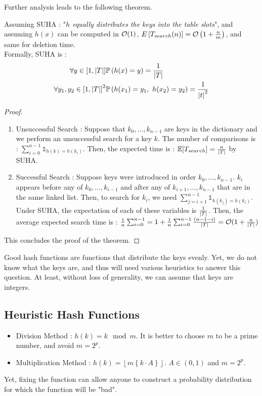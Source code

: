 \documentclass{cours}
\begin{document}
Further analysis leads to the following theorem. 
\begin{theorem}
    Assuming SUHA : "\textit{$h$ equally distributes the keys into the table slots}", and assuming $h(x)$ can be computed in $\mathcal{O}(1)$, $E\left[T_{search}(n)\right] = \mathcal{O}\left(1 + \frac{n}{m}\right)$, and same for deletion time. \\
    Formally, SUHA is : 
    \[
        \begin{aligned}
            \forall y \in \left[1, \left|T\right|\right] & \mathbb{P}\left(h(x) = y\right) = \frac{1}{\left|T\right|}\\
            \forall y_{1}, y_{2} \in \left[1, \left|T\right|\right]^{2} & \mathbb{P}\left(h(x_{1}) = y_{1},\ h(x_{2}) = y_{2}\right) = \frac{1}{\left|t\right|^{2}}
        \end{aligned}    
    \]
\end{theorem}
\begin{proof}
    \begin{enumerate}
        \item Unsuccessful Search : Suppose that $k_{0}, \ldots, k_{n-1}$ are keys in the dictionary and we perform an unsuccessful search for a key $k$.
        The number of comparisons is : $\sum_{i = 0}^{n-1} \mathbb{1}_{h(k) = h(k_{i})}$. Then, the expected time is : $\mathbb{E}[T_{search}] = \frac{n}{\left|T\right|}$ by SUHA.
        \item Successful Search : Suppose keys were introduced in order $k_{0}, \ldots, k_{n-1}$. $k_{i}$ appears before any of $k_{0}, \ldots, k_{i-1}$ and after any of $k_{i+1}, \ldots, k_{n-1}$ that are in the same linked list. Then, to search for $k_{i}$, we need $\sum_{j = i + 1}^{n- 1} \mathbb{1}_{h(k_{j}) = h(k_{i})}$. Under SUHA, the expectation of each of these variables is $\frac{1}{\left|T\right|}$. Then, the average expected search time is : $\frac{1}{n}\sum_{i = 0}^{n-1} = 1 + \frac{1}{n}\sum_{i = 0}^{n-1}\frac{(n-1-i)}{\left|T\right|} = \mathcal{O}(1 + \frac{n}{\left|T\right|})$
    \end{enumerate}
    This concludes the proof of the theorem. 
\end{proof}

Good hash functions are functions that distribute the keys evenly. Yet, we do not know what the keys are, and thus will need various heuristics to answer this question. At least, without loss of generality, we can assume that keys are integers.

\subsection{Heuristic Hash Functions}
    \begin{itemize}
        \item Division Method : $h(k) = k \mod m$. It is better to choose $m$ to be a prime number, and avoid $m = 2^{p}$.
        \item Multiplication Method : $h(k) = \left\lfloor m \left\{k\cdot A\right\}\right\rfloor$. $A \in (0, 1)$ and $m = 2^{p}$.
    \end{itemize}
Yet, fixing the function can allow anyone to construct a probability distribution for which the function will be "bad".
\end{document}
